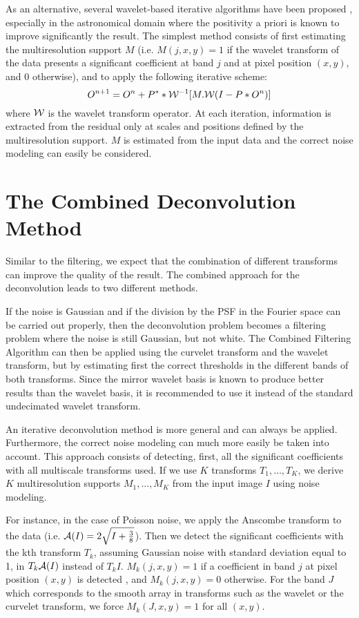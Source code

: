 As an alternative, 
several wavelet-based iterative algorithms have been proposed 
 \cite{starck:book98}, especially in the astronomical
domain where the positivity a priori is known to improve 
significantly the result. The simplest method consists of first 
estimating the multiresolution support $M$ (i.e. $M(j,x,y)= 1$ if   
the wavelet transform of the data presents a significant coefficient 
at band $j$ and at pixel position $(x,y)$, and $0$ otherwise), and to
apply the following iterative scheme:
\begin{equation}
O^{n+1} = O^{n} + P^* * {\mathcal W}^{-1}[M.{\mathcal W} (I - P * O^n)]
\end{equation}
where ${\mathcal W}$ is the wavelet transform operator.
At each iteration, information is extracted from the 
residual only at scales and positions defined by the multiresolution support.
$M$ is estimated from the input data and the correct noise modeling
can easily be considered.

 
\section{The Combined Deconvolution Method}
\label{cbdec}
 Similar to the filtering, we expect that the combination 
of different transforms can improve the quality of the result.
The combined approach for the deconvolution leads to two different 
methods. 

If the noise is Gaussian and if the division by the PSF in the Fourier space 
can be carried out properly, then the deconvolution problem becomes a 
filtering problem where the noise is still Gaussian, but not white.
The Combined Filtering Algorithm can then be applied using the curvelet 
transform and the wavelet transform, but by estimating first the 
correct thresholds in the different bands of both transforms.  
Since the mirror wavelet basis is known to produce better results than
the wavelet basis, it is recommended to use it instead of the standard
undecimated wavelet transform.

An iterative deconvolution method 
 is more general and can always be applied. 
Furthermore,
the correct noise modeling can much more easily be taken into account.
This approach consists of detecting, first, all the significant coefficients
with all multiscale transforms used. If we use $K$ transforms
$T_1, \dots, T_K$, we derive $K$ multiresolution supports $M_1, \dots, M_K$
from the input image $I$ using noise modeling.

For instance, in the case of Poisson noise, we apply the Anscombe transform
to the data (i.e. ${\mathcal A}(I) = 2 \sqrt{I + \frac{3}{8}}$). Then
we detect the significant coefficients with the kth transform $T_k$, 
assuming Gaussian noise with standard deviation equal to 1,
in $T_k {\mathcal A}(I)$ instead of $T_k I$.  $M_k(j,x,y) = 1$ if a coefficient
in band $j$ at pixel position $(x,y)$ is detected , and  $M_k(j,x,y) = 0$
otherwise. For the band $J$ which corresponds to the smooth array
in transforms such as the wavelet or the curvelet transform, 
we force $M_k(J,x,y) = 1$ for all $(x,y)$.


